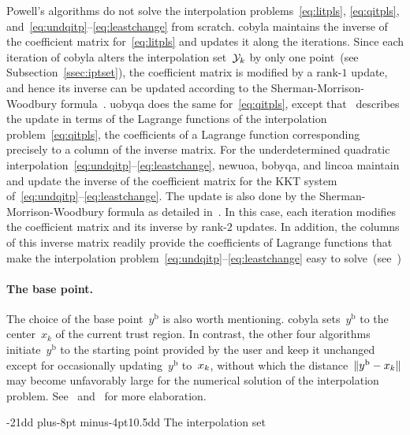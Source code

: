 \documentclass[
    smallextended,  %
    final,          %
]{svjour3}
\makeatletter
\newcommand{\base}{{\text{b}}}
\newcommand{\iter}[1][k]{x\ifthenelse{\equal{#1}{}}{}{_{#1}}}
\newcommand{\norm}[2][]{#1\lVert#2#1\rVert}
\newcommand{\xpt}[1][k]{\mathcal{Y}\ifthenelse{\equal{#1}{}}{}{_{#1}}}
\def\subsubsection{\@startsection{subsubsection}{2}{\z@}%
    {-21dd plus-8pt minus-4pt}{10.5dd}
     {\normalsize\bfseries}}
\makeatother
\begin{document}
Powell's algorithms do not solve the interpolation problems~\eqref{eq:litpls}, \eqref{eq:qitpls},
and~\mbox{\eqref{eq:undqitp}--\eqref{eq:leastchange}} from scratch.
\gls{cobyla} maintains the inverse of the coefficient matrix for~\eqref{eq:litpls}
and updates it along the iterations.
Since each iteration of \gls{cobyla} alters the interpolation set~$\xpt$ by only one
point~(see Subsection~\ref{ssec:iptset}), the coefficient matrix is modified by a rank-$1$ update, and hence
its inverse can be updated according to the Sherman-Morrison-Woodbury formula~\cite{Hager_1989}.
\gls{uobyqa} does the same for~\eqref{eq:qitpls},
except that~\cite[\S~4]{Powell_2002} describes the update in terms of the Lagrange functions of the
interpolation problem~\eqref{eq:qitpls}, the coefficients of a Lagrange function corresponding
precisely to a column of the inverse matrix.
For the underdetermined quadratic interpolation~\mbox{\eqref{eq:undqitp}--\eqref{eq:leastchange}},
\gls{newuoa}, \gls{bobyqa}, and \gls{lincoa}
maintain and update the inverse of the coefficient matrix for the KKT system
of~\mbox{\eqref{eq:undqitp}--\eqref{eq:leastchange}}. The update is also done by the
Sherman-Morrison-Woodbury formula as detailed in~\cite[\S~2]{Powell_2004c}. In this case, each
iteration modifies the coefficient matrix and its inverse by rank-$2$ updates.
In addition, the columns of this inverse matrix readily provide the coefficients of Lagrange
functions that make the interpolation problem~\mbox{\eqref{eq:undqitp}--\eqref{eq:leastchange}}
easy to solve~(see~\mbox{\cite[\S~3]{Powell_2004b}})


\paragraph{\textnormal{\textbf{The base point.}}}

The choice of the base point~$y^{\base}$ is also worth mentioning.
\Gls{cobyla} sets~$y^{\base}$ to the center~$x_k$ of the current trust region.
In contrast, the other four algorithms initiate~$y^{\base}$ to the starting point provided by the
user and keep it unchanged except for occasionally updating~$y^{\base}$ to~$\iter$, without which
the distance~$\norm{y^{\base}-\iter}$ may become unfavorably large for the numerical solution of the
interpolation problem. See~\cite[\S~5]{Powell_2004b} and~\cite[\S~7]{Powell_2006} for more elaboration.

\subsubsection{The interpolation set}
\label{ssec:iptset}
\end{document}

